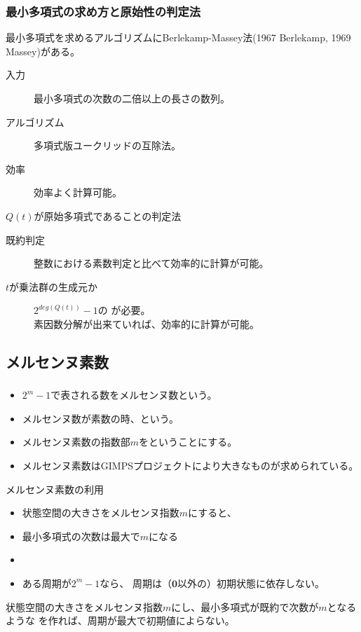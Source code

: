 \documentclass[cjk, dvips, xcolor=dvipsnames, hyperref={bookmarks=false}]{beamer}
\begin{document}
\begin{frame}[t]
  \frametitle{最小多項式の求め方と原始性の判定法}
  最小多項式を求めるアルゴリズムにBerlekamp-Massey法(1967 Berlekamp,
  1969 Massey)がある。
  \begin{description}
  \item[入力] 最小多項式の次数の二倍以上の長さの数列。
  \item[アルゴリズム] 多項式版ユークリッドの互除法。
  \item[効率] 効率よく計算可能。
  \end{description}

  \pause
  \vspace{\baselineskip}
  $Q(t)$が原始多項式であることの判定法
  \begin{description}
  \item[既約判定] 整数における素数判定と比べて効率的に計算が可能。
  \item[$t$が乗法群の生成元か] $2^{deg(Q(t))}-1$の
    が必要。\\
    素因数分解が出来ていれば、効率的に計算が可能。
  \end{description}
\end{frame}

\subsection{メルセンヌ素数}
\begin{frame}[t]
  \frametitle{\insertsubsection}
  \begin{itemize}
  \item $2^m-1$で表される数をメルセンヌ数という。
  \item メルセンヌ数が素数の時、という。
  \item メルセンヌ素数の指数部$m$をということにする。
  \item メルセンヌ素数はGIMPSプロジェクトにより大きなものが求められている。
  \end{itemize}

  \pause
  \begin{block}{メルセンヌ素数の利用}
    \begin{itemize}
    \item[] 状態空間の大きさをメルセンヌ指数$m$にすると、
    \item 最小多項式の次数は最大で$m$になる
    \item {}
    \item ある周期が$2^m-1$なら、
      周期は（$\mathbf{0}$以外の）初期状態に依存しない。
    \end{itemize}
    状態空間の大きさをメルセンヌ指数$m$にし、最小多項式が既約で次数が$m$となるような
    \FLPRNG を作れば、周期が最大で初期値によらない。
  \end{block}
\end{frame}
\end{document}
